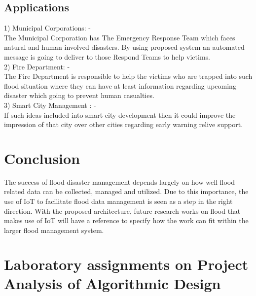\documentclass[a4paper,12pt]{report}
\begin{document}
\section{Applications}
1)	Municipal Corporations: - \\
The Municipal Corporation has The Emergency Response Team which faces natural and human involved disasters. By using proposed system an automated message is going to deliver to those Respond Teams to help victims.\\
2)	Fire Department: -\\
The Fire Department is responsible to help the victims who are trapped into such flood situation where they can have at least information regarding upcoming disaster which going to prevent human casualties. \\
3)	Smart City Management : -\\
If such ideas included into smart city development then it could improve the impression of that city over other cities regarding early warning relive support.


\chapter {Conclusion }
The success of flood disaster management depends largely on how well flood related data can be collected, managed and utilized. Due to this importance, the use of IoT to facilitate flood data management is seen as a step in the right direction. With the proposed architecture, future research works on flood that makes use of IoT will have a reference to specify how the work can fit within the larger flood management system.  \newline



\appendix 
{}


\chapter{Laboratory assignments on Project Analysis of Algorithmic Design}
\end{document}
